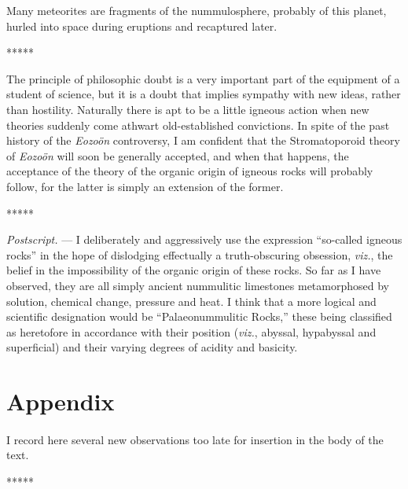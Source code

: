 \documentclass[a4paper, 12pt, oneside]{article}
\begin{document}
Many meteorites are fragments of the nummulosphere, probably of this planet, hurled into space during eruptions and recaptured later.

\centerline{*\hspace{15mm}*\hspace{15mm}*\hspace{15mm}*\hspace{15mm}*}
\bigskip

The principle of philosophic doubt is a very important part of the equipment of a student of science, but it is a doubt that implies sympathy with new ideas, rather than hostility. Naturally there is apt to be a little igneous action when new theories suddenly come athwart old-established convictions. In spite of the past history of the \emph{Eozoön} controversy, I am confident that the Stromatoporoid theory of \emph{Eozoön} will soon be generally accepted, and when that happens, the acceptance of the theory of the organic origin of igneous rocks will probably follow, for the latter is simply an extension of the former.

\centerline{*\hspace{15mm}*\hspace{15mm}*\hspace{15mm}*\hspace{15mm}*}
\bigskip

\small
\emph{Postscript.} --- I deliberately and aggressively use the expression ``so-called igneous rocks'' in the hope of dislodging effectually a truth-obscuring obsession, \emph{viz.}, the belief in the impossibility of the organic origin of these rocks. So far as I have observed, they are all simply ancient nummulitic limestones metamorphosed by solution, chemical change, pressure and heat. I think that a more logical and scientific designation would be ``Palaeonummulitic Rocks,'' these being classified as heretofore in accordance with their position (\emph{viz.}, abyssal, hypabyssal and superficial) and their varying degrees of acidity and basicity.
\normalsize
\clearpage
\section{Appendix}
\Large
\paragraph{}
I record here several new observations too late for insertion in the body of the text.

\centerline{*\hspace{15mm}*\hspace{15mm}*\hspace{15mm}*\hspace{15mm}*}
\bigskip
\end{document}
